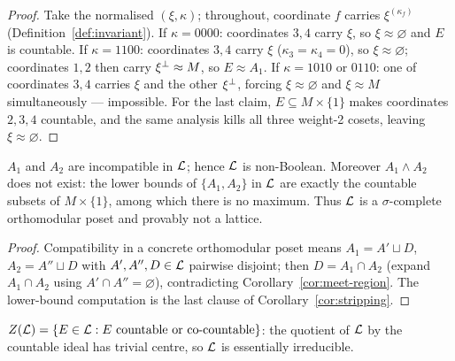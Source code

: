 \begin{proof}
Take the normalised $(\xi,\kappa)$; throughout, coordinate $f$ carries
$\xi^{(\kappa_f)}$ (Definition~\ref{def:invariant}). If $\kappa=0000$:
coordinates $3,4$ carry $\xi$, so $\xi\approx\varnothing$ and $E$ is countable.
If $\kappa=1100$: coordinates $3,4$ carry $\xi$ ($\kappa_3=\kappa_4=0$), so
$\xi\approx\varnothing$; coordinates $1,2$ then carry $\xi{}^{\perp}\approx M$, so
$E\approx A_1$. If $\kappa=1010$ or $0110$: one of coordinates $3,4$ carries
$\xi$ and the other $\xi{}^{\perp}$, forcing $\xi\approx\varnothing$ and
$\xi\approx M$ simultaneously --- impossible. For the last claim,
$E\subseteq M\times\{1\}$ makes coordinates $2,3,4$ countable, and the same
analysis kills all three weight-2 cosets, leaving $\xi\approx\varnothing$.
\end{proof}

\begin{corollary}\label{cor:incompat}
$A_1$ and $A_2$ are incompatible in $\mathcal{L}$; hence $\mathcal{L}$ is non-Boolean. Moreover
$A_1\wedge A_2$ does not exist: the lower bounds of $\{A_1,A_2\}$ in $\mathcal{L}$ are
exactly the countable subsets of $M\times\{1\}$, among which there is no
maximum. Thus $\mathcal{L}$ is a $\sigma$-complete orthomodular poset and provably not a
lattice.
\end{corollary}

\begin{proof}
Compatibility in a concrete orthomodular poset means $A_1=A'\sqcup D$,
$A_2=A''\sqcup D$ with $A',A'',D\in\mathcal{L}$ pairwise disjoint; then
$D=A_1\cap A_2$ (expand $A_1\cap A_2$ using $A'\cap A''=\varnothing$),
contradicting Corollary~\ref{cor:meet-region}. The lower-bound computation is
the last clause of Corollary~\ref{cor:stripping}.
\end{proof}

\begin{corollary}[centre]\label{cor:centre}
$Z(\mathcal{L})=\{E\in\mathcal{L} : E \text{ countable or co-countable}\}$: the quotient of
$\mathcal{L}$ by the countable ideal has trivial centre, so $\mathcal{L}$ is essentially
irreducible.
\end{corollary}

